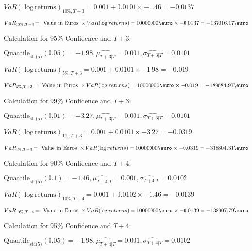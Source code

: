 \indent\indent $VaR(\log \text{returns})_{10\%, T + 3} = 0.001 + 0.0101\times-1.46 = -0.0137$

\indent\indent $VaR_{10\%, T + 3} = \text{ Value in Euros } \times VaR(\log returns) = 10 000 000 \text{\euro} \times-0.0137 = -137016.17 \text{\euro}$\newline




Calculation for 95\% Confidence and $T+3$:

\indent\indent $\text{Quantile}_\text{std(5)}(0.05) = -1.98,\hat{\mu_{T+3|T}} = 0.001, \hat{\sigma_{T+3|T}} = 0.0101$

\indent\indent $VaR(\log \text{returns})_{5\%, T + 3} = 0.001 + 0.0101\times-1.98 = -0.019$

\indent\indent $VaR_{5\%, T + 3} = \text{ Value in Euros } \times VaR(\log returns) = 10 000 000 \text{\euro} \times-0.019 = -189684.97 \text{\euro}$\newline




Calculation for 99\% Confidence and $T+3$:

\indent\indent $\text{Quantile}_\text{std(5)}(0.01) = -3.27,\hat{\mu_{T+3|T}} = 0.001, \hat{\sigma_{T+3|T}} = 0.0101$

\indent\indent $VaR(\log \text{returns})_{1\%, T + 3} = 0.001 + 0.0101\times-3.27 = -0.0319$

\indent\indent $VaR_{1\%, T + 3} = \text{ Value in Euros } \times VaR(\log returns) = 10 000 000 \text{\euro} \times-0.0319 = -318804.31 \text{\euro}$\newline




Calculation for 90\% Confidence and $T+4$:

\indent\indent $\text{Quantile}_\text{std(5)}(0.1) = -1.46,\hat{\mu_{T+4|T}} = 0.001, \hat{\sigma_{T+4|T}} = 0.0102$

\indent\indent $VaR(\log \text{returns})_{10\%, T + 4} = 0.001 + 0.0102\times-1.46 = -0.0139$

\indent\indent $VaR_{10\%, T + 4} = \text{ Value in Euros } \times VaR(\log returns) = 10 000 000 \text{\euro} \times-0.0139 = -138907.79 \text{\euro}$\newline




Calculation for 95\% Confidence and $T+4$:

\indent\indent $\text{Quantile}_\text{std(5)}(0.05) = -1.98,\hat{\mu_{T+4|T}} = 0.001, \hat{\sigma_{T+4|T}} = 0.0102$

